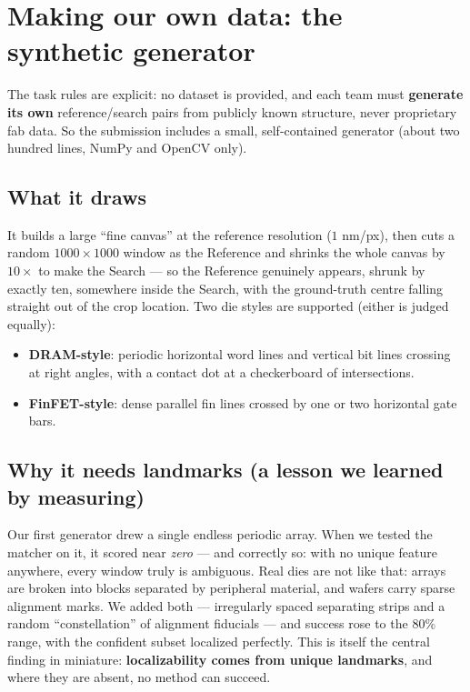 \documentclass[11pt]{article}
\newcommand{\term}[1]{\textbf{\color{klablue}#1}}
\begin{document}
\section{Making our own data: the synthetic generator}
\label{sec:generator}

The task rules are explicit: no dataset is provided, and each team must
\term{generate its own} reference/search pairs from publicly known structure,
never proprietary fab data. So the submission includes a small, self-contained
generator (about two hundred lines, NumPy and OpenCV only).

\subsection{What it draws}
It builds a large ``fine canvas'' at the reference resolution ($1$ nm/px), then
cuts a random $1000\times1000$ window as the Reference and shrinks the whole
canvas by $10\times$ to make the Search --- so the Reference genuinely appears,
shrunk by exactly ten, somewhere inside the Search, with the ground-truth centre
falling straight out of the crop location. Two die styles are supported (either
is judged equally):
\begin{itemize}[leftmargin=1.4em]
  \item \term{DRAM-style}: periodic horizontal word lines and vertical bit lines
        crossing at right angles, with a contact dot at a checkerboard of
        intersections.
  \item \term{FinFET-style}: dense parallel fin lines crossed by one or two
        horizontal gate bars.
\end{itemize}

\subsection{Why it needs landmarks (a lesson we learned by measuring)}
Our first generator drew a single endless periodic array. When we tested the
matcher on it, it scored near \emph{zero} --- and correctly so: with no unique
feature anywhere, every window truly is ambiguous. Real dies are not like that:
arrays are broken into blocks separated by peripheral material, and wafers carry
sparse alignment marks. We added both --- irregularly spaced separating strips
and a random ``constellation'' of alignment fiducials --- and success rose to
the $80\%$ range, with the confident subset localized perfectly. This is itself
the central finding in miniature: \term{localizability comes from unique
landmarks}, and where they are absent, no method can succeed.
\end{document}
